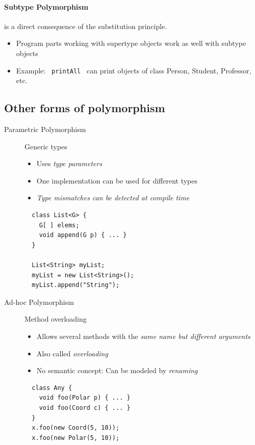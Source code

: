 \paragraph{Subtype Polymorphism} is a direct consequence of the substitution principle.
\begin{itemize}
 \item Program parts working with supertype objects work as well with subtype objects
 \item Example: \lstinline{ printAll } can print objects of class Person, Student, Professor, etc.
\end{itemize}
\subsection{Other forms of polymorphism}
\begin{description}
 \item[Parametric Polymorphism] Generic types
  \begin{itemize}
   \item Uses \emph{type parameters}
   \item One implementation can be used for different types
   \item \emph{Type mismatches can be detected at compile time}
  \end{itemize}
  \lstset{language=Java}
  \begin{lstlisting}
  class List<G> {
    G[ ] elems;
    void append(G p) { ... }
  }
  
  List<String> myList;
  myList = new List<String>();
  myList.append("String");
  \end{lstlisting}
 \item[Ad-hoc Polymorphism] Method overloading
  \begin{itemize}
   \item Allows several methods with the \emph{same name but different arguments}
   \item Also called \emph{overloading}
   \item No semantic concept: Can be modeled by \emph{renaming}
  \end{itemize}
  \begin{lstlisting}
  class Any {
    void foo(Polar p) { ... }
    void foo(Coord c) { ... }
  }
  x.foo(new Coord(5, 10));
  x.foo(new Polar(5, 10));
  \end{lstlisting}
\end{description}

